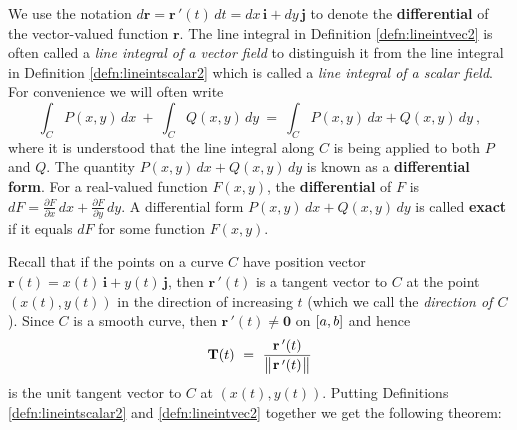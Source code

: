 We use the notation $d\mathbf{r} = \mathbf{r}\,'(t)\,dt = dx\,\mathbf{i} + dy\,\mathbf{j}$ to
denote the \textbf{differential}
of the vector-valued function $\mathbf{r}$. The line integral in Definition \ref{defn:lineintvec2} is
often called a \emph{line integral of a vector field} to distinguish it from the line integral in
Definition \ref{defn:lineintscalar2} which is called a \emph{line integral of a scalar field}. For
convenience we will often write
\begin{displaymath}
 \int_C P(x,y)\,dx ~+~ \int_C Q(x,y)\,dy ~=~ \int_C P(x,y)\,dx + Q(x,y)\,dy ~,
\end{displaymath}
where it is understood that the line integral along $C$ is being applied to both $P$ and $Q$.
The quantity $P(x,y)\,dx + Q(x,y)\,dy$ is known as a \textbf{differential form}. For a
real-valued function $F(x,y)$, the \textbf{differential} of $F$ is $dF = \frac{\partial F}{\partial x}\,dx +
\frac{\partial F}{\partial y}\,dy$. A differential form $P(x,y)\,dx + Q(x,y)\,dy$ is called \textbf{exact} if it equals $dF$ for some function $F(x,y)$.

Recall that if the points on a curve $C$ have position vector $\mathbf{r}(t) = x(t)\,\mathbf{i} + y(t)\,\mathbf{j}$,
then $\mathbf{r}\,'(t)$ is a tangent vector to $C$ at the point $(x(t),y(t))$ in the direction of increasing $t$
(which we call the \emph{direction of $C$}). Since $C$ is a smooth curve, then $\mathbf{r}\,'(t) \ne \mathbf{0}$ on
$\lbrack a,b \rbrack$ and hence
\begin{displaymath}
 \mathbf{T}(t) ~=~ \frac{\mathbf{r}\,'(t)}{\bigl\lVert\mspace{1mu}\mathbf{r}\,'(t)\mspace{1mu}\bigr\rVert}
\end{displaymath}
is the unit tangent vector to $C$ at $(x(t),y(t))$. Putting Definitions \ref{defn:lineintscalar2} and
\ref{defn:lineintvec2} together we get the following theorem:

